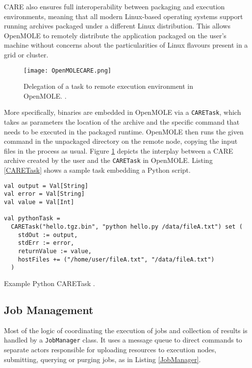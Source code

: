 CARE also ensures full interoperability between packaging and execution environments, meaning that all modern Linux-based operating systems support running archives packaged under a different Linux distribution. This allows OpenMOLE to remotely distribute the application packaged on the user's machine without concerns about the particularities of Linux flavours present in a grid or cluster.

\begin{figure}[h]
	\centering
		\texttt{[image: OpenMOLECARE.png]}
	\caption{Delegation of a task to remote execution environment in OpenMOLE. \cite{Leclaire2016}.}
	\label{OpenMOLECARE}
\end{figure}

More specifically, binaries are embedded in OpenMOLE via a \verb|CARETask|, which takes as parameters the location of the archive and the specific command that needs to be executed in the packaged runtime. OpenMOLE then runs the given command in the unpackaged directory on the remote node, copying the input files in the process as usual. Figure \ref{OpenMOLECARE} depicts the interplay between a CARE archive created by the user and the \verb|CARETask| in OpenMOLE. Listing \ref{CARETask} shows a sample task embedding a Python script.

\begin{listing}[h]
	\centering
	\begin{minipage}{13cm}
		\begin{verbatim}
val output = Val[String]
val error = Val[String]
val value = Val[Int]

val pythonTask = 
  CARETask("hello.tgz.bin", "python hello.py /data/fileA.txt") set ( 
    stdOut := output,
    stdErr := error, 
    returnValue := value, 
    hostFiles += ("/home/user/fileA.txt", "/data/fileA.txt") 
  )
		\end{verbatim}
	\end{minipage}
	\caption{Example Python CARETask \cite{Leclaire2016}.}
	\label{CARETask}
\end{listing}

\subsection{Job Management}

Most of the logic of coordinating the execution of jobs and collection of results is handled by a \verb|JobManager| class. It uses a message queue to direct commands to separate actors responsible for uploading resources to execution nodes, submitting, querying or purging jobs, as in Listing \ref{JobManager}. 

